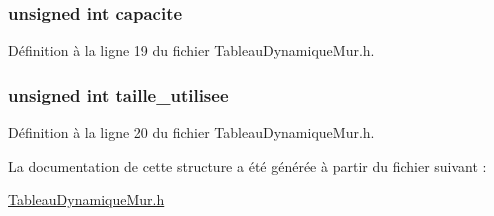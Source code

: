 \hypertarget{struct_tableau_dynamique_mur_ac3e3c7196292bbc416a904d29ee638c8}{
\subsubsection[{capacite}]{\setlength{\rightskip}{0pt plus 5cm}unsigned int capacite}}\label{struct_tableau_dynamique_mur_ac3e3c7196292bbc416a904d29ee638c8}


Définition à la ligne 19 du fichier Tableau\-Dynamique\-Mur.\-h.

\hypertarget{struct_tableau_dynamique_mur_aaf681889cbd00b7c45951f63b10f969a}{
\subsubsection[{taille\-\_\-utilisee}]{\setlength{\rightskip}{0pt plus 5cm}unsigned int taille\-\_\-utilisee}}\label{struct_tableau_dynamique_mur_aaf681889cbd00b7c45951f63b10f969a}


Définition à la ligne 20 du fichier Tableau\-Dynamique\-Mur.\-h.



La documentation de cette structure a été générée à partir du fichier suivant \-:\begin{DoxyCompactItemize}
\item 
\hyperlink{_tableau_dynamique_mur_8h}{Tableau\-Dynamique\-Mur.\-h}\end{DoxyCompactItemize}
